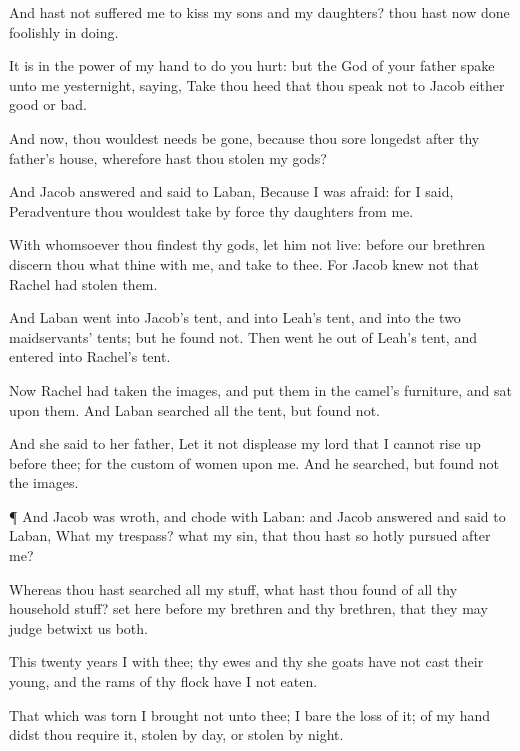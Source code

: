 {And hast not
suffered me to
kiss my
sons and my
daughters? thou hast now done
foolishly in
{}
doing.

It
is in the
power of my
hand to
do you
hurt: but the
God of your
father
spake unto me
yesternight,
saying, Take thou
heed that thou speak
not to
Jacob either
good or
bad.

And now,
{} thou wouldest
needs be
gone, because thou
sore
longedst after thy
father’s
house,
{} wherefore hast thou
stolen my
gods?

And
Jacob
answered and
said to
Laban, Because I was
afraid: for I
said,
Peradventure thou wouldest take by
force thy
daughters from me.

With
whomsoever thou
findest thy
gods, let him not
live:
before our
brethren
discern thou what
{} thine with me, and
take
{} to thee. For
Jacob
knew not that
Rachel had
stolen them.

And
Laban
went into
Jacob’s
tent, and into
Leah’s
tent, and into the
two
maidservants’
tents; but he
found
{} not. Then went he
out of
Leah’s
tent, and
entered into
Rachel’s
tent.

Now
Rachel had
taken the
images, and
put them in the
camel’s
furniture, and
sat upon them. And
Laban
searched all the
tent, but
found
{} not.

And she
said to her
father, Let it not
displease my
lord that I
cannot rise
up before
thee; for the
custom of
women
{} upon me. And he
searched, but
found not the
images.


\par }{\PP {}¶ And
Jacob was
wroth, and
chode with
Laban: and
Jacob
answered and
said to
Laban, What
{} my
trespass? what
{} my
sin, that thou hast so hotly
pursued after
me?

Whereas thou hast
searched all my
stuff, what hast thou
found of all thy
household
stuff?
set
{}
here before my
brethren and thy
brethren, that they may
judge
betwixt us
both.

This
twenty
years
{} I
{} with thee; thy
ewes and thy she
goats have not cast their
young, and the
rams of thy
flock have I not
eaten.

That which was
torn
{} I
brought not unto thee; I bare the
loss of it; of my
hand didst thou
require it,
{}
stolen by
day, or
stolen by
night.

}
